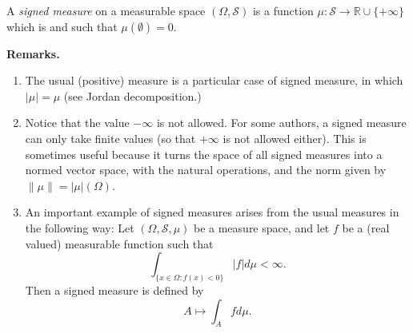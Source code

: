 \documentclass[12pt]{article}
\begin{document}
A \emph{signed measure} on a measurable space $(\Omega,\mathscr{S})$ is a function $\mu:\mathscr{S}\rightarrow \mathbb{R}\cup\{+\infty\}$ which is  and such that $\mu(\emptyset)=0$.

\textbf{Remarks.} 
\begin{enumerate}
\item The usual (positive) measure is a particular case of signed measure, in which $|\mu| = \mu$ (see Jordan decomposition.)

\item Notice that the value $-\infty$ is not allowed. For some authors, a signed measure can only take finite values (so that $+\infty$ is not allowed either). This is sometimes useful because it turns the space of all signed measures into a normed vector space, with the natural operations, and the norm given by $\|\mu\| = |\mu|(\Omega)$.

\item An important example of signed measures arises from the usual measures in the following way: Let $(\Omega,\mathscr{S},\mu)$ be a measure space, and let $f$ be a (real valued) measurable function such that 
\[\int_{\{x\in \Omega:f(x)<0\}} |f| d\mu <\infty.\]
Then a signed measure is defined by
\[A\mapsto \int_A fd\mu.\]
\end{enumerate}
\end{document}
